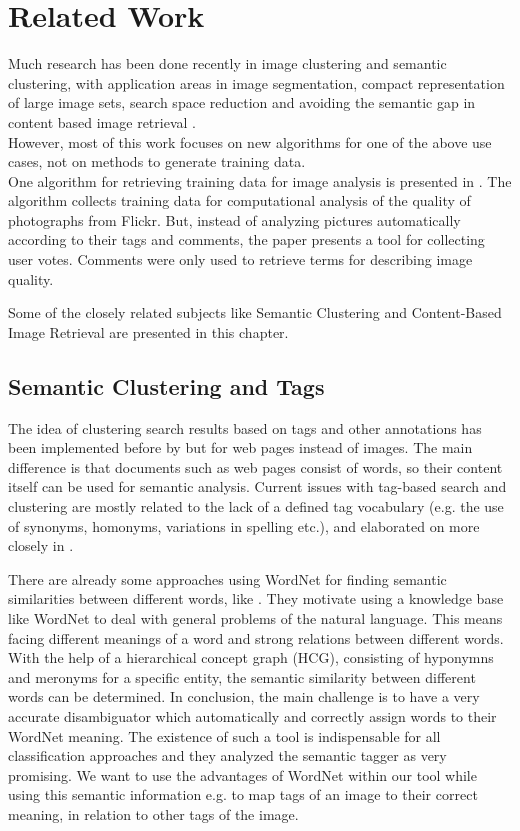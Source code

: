 \section{Related Work}
\label{sec_relatedwork}

Much research has been done recently in image clustering and semantic clustering, with application areas in image segmentation, compact representation of large image sets, search space reduction and avoiding the semantic gap in content based image retrieval \cite{Lim2011}. \\
However, most of this work focuses on new algorithms for one of the above use cases, not on methods to generate training data. \\

One algorithm for retrieving training data for image analysis is presented in \cite{Orendovici2010}. The algorithm collects training data for computational analysis of the quality of photographs from Flickr. But, instead of analyzing pictures automatically according to their tags and comments, the paper presents a tool for collecting user votes. Comments were only used to retrieve terms for describing image quality.

\bigskip

Some of the closely related subjects like Semantic Clustering and Content-Based Image Retrieval are presented in this chapter.

\subsection{Semantic Clustering and Tags}
The idea of clustering search results based on tags and other annotations has been implemented before by \cite{Ramage2009} but for web pages instead of images. The main difference is that documents such as web pages consist of words, so their content itself can be used for semantic analysis.
Current issues with tag-based search and clustering are mostly related to the lack of a defined tag vocabulary (e.g. the use of synonyms, homonyms, variations in spelling etc.), and elaborated on more closely in \cite{Auer2011}.

\bigskip

There are already some approaches using WordNet for finding semantic similarities between different words, like \cite{richardson1994using}. They motivate using a knowledge base like WordNet to deal with general problems of the natural language. This means facing different meanings of a word and strong relations between different words. With the help of a hierarchical concept graph (HCG), consisting of hyponymns and meronyms for a specific entity, the semantic similarity between different words can be determined. In conclusion, the main challenge is to have a very accurate disambiguator which automatically and correctly assign words to their WordNet meaning. The existence of such a tool is indispensable for all classification approaches and they analyzed the semantic tagger as very promising. 
We want to use the advantages of WordNet within our tool while using this semantic information e.g. to map tags of an image to their correct meaning, in relation to other tags of the image. 


